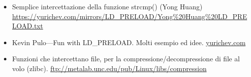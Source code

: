 \begin{itemize}

\item
Semplice intercettazione della funzione strcmp() (Yong Huang) 
\url{https://yurichev.com/mirrors/LD_PRELOAD/Yong%20Huang%20LD_PRELOAD.txt}

\item
Kevin Pulo---Fun with LD\_PRELOAD. Molti esempio ed idee.
\href{http://yurichev.com/mirrors/LD_PRELOAD/lca2009.pdf}{yurichev.com}

\item
Funzioni che intercettano file, per la compressione/decompressione di file al volo (zlibc). \url{ftp://metalab.unc.edu/pub/Linux/libs/compression}

\end{itemize}

